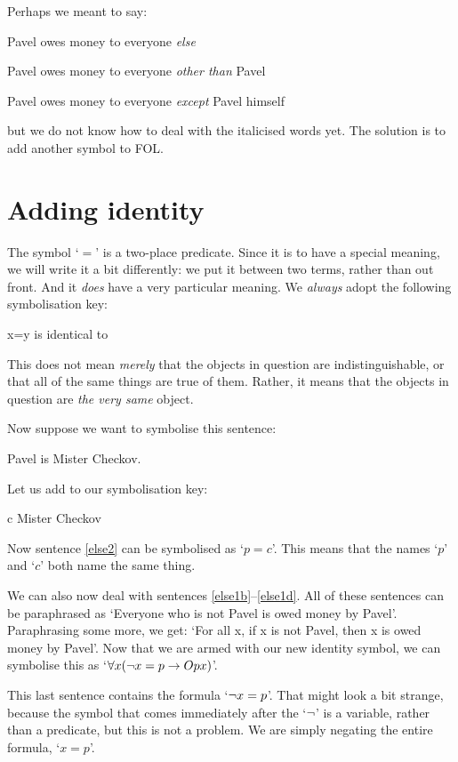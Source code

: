 Perhaps we meant to say:
	\begin{earg}
		\item[\ex{else1b}] Pavel owes money to everyone \emph{else}
		\item[\ex{else1c}] Pavel owes money to everyone \emph{other than} Pavel
		\item[\ex{else1d}] Pavel owes money to everyone \emph{except} Pavel himself
	\end{earg}
but we do not know how to deal with the italicised words yet. The solution is to add another symbol to FOL. 

\section{Adding identity}

The symbol `$=$' is a two-place predicate. Since it is to have a special meaning, we will write it a bit differently: we put it between two terms, rather than out front. And it \emph{does} have a very particular meaning. We \emph{always} adopt the following symbolisation key:
	\begin{ekey}
		\item[x=y]  is identical to 
	\end{ekey}
This does not mean \emph{merely} that the objects in question are indistinguishable, or that all of the same things are true of them. Rather, it means that the objects in question are \emph{the very same} object.

Now suppose we want to symbolise this sentence:
\begin{earg}
\item[\ex{else2}] Pavel is Mister Checkov.
\end{earg}
Let us add to our symbolisation key:
	\begin{ekey}
		\item[c] Mister Checkov
	\end{ekey}
Now sentence \ref{else2} can be symbolised as `$p=c$'. This means that the names `$p$' and `$c$' both name the same thing.

We can also now deal with sentences \ref{else1b}--\ref{else1d}. All of these sentences can be  paraphrased as `Everyone who is not Pavel is owed money by Pavel'. Paraphrasing some more, we get: `For all x, if x is not Pavel, then x is owed money by Pavel'. Now that we are armed with our new identity symbol, we can symbolise this as `$\forall x (\neg x = p \rightarrow Opx)$'.

This last sentence contains the formula `$\neg x = p$'. That might look a bit strange, because the symbol that comes immediately after the `$\neg$' is a variable, rather than a predicate, but this is not a problem. We are simply negating the entire formula, `$x = p$'. 


